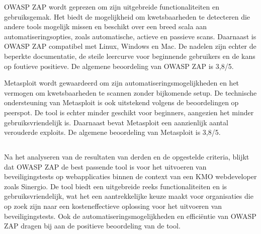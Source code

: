 OWASP ZAP wordt geprezen om zijn uitgebreide functionaliteiten en gebruiksgemak. Het biedt de mogelijkheid om kwetsbaarheden 
te detecteren die andere tools mogelijk missen en beschikt over een breed scala aan automatiseringsopties, zoals automatische, 
actieve en passieve scans. Daarnaast is OWASP ZAP compatibel met Linux, Windows en Mac. De nadelen zijn echter de beperkte 
documentatie, de steile leercurve voor beginnende gebruikers en de kans op foutieve positieve. De algemene beoordeling van 
OWASP ZAP is 3,8/5.

Metasploit wordt gewaardeerd om zijn automatiseringsmogelijkheden en het vermogen om kwetsbaarheden te scannen zonder 
bijkomende setup. De technische ondersteuning van Metasploit is ook uitstekend volgens de beoordelingen op peerspot. De tool 
is echter minder geschikt voor beginners, aangezien het minder gebruiksvriendelijk is. Daarnaast bevat Metasploit een 
aanzienlijk aantal verouderde exploits. De algemene beoordeling van Metasploit is 3,8/5.

\subsection{}
Na het analyseren van de resultaten van derden en de opgestelde criteria, blijkt dat OWASP ZAP de best passende tool is voor het uitvoeren van 
beveiligingstests op webapplicaties binnen de context van een KMO webdeveloper zoals Sinergio. De tool biedt een uitgebreide reeks functionaliteiten en is gebruiksvriendelijk, wat 
het een aantrekkelijke keuze maakt voor organisaties die op zoek zijn naar een kosteneffectieve oplossing voor het uitvoeren 
van beveiligingstests. Ook de automatiseringsmogelijkheden en efficiëntie van OWASP ZAP dragen bij aan de positieve 
beoordeling van de tool.

\section{}
\subsection{}

